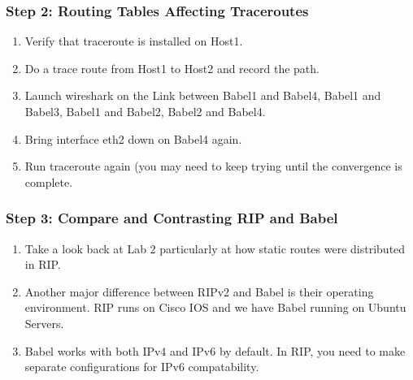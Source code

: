 \documentclass[main.tex]{subfiles}
\begin{document}
\begin{itemize}
\subsubsection{Step 2: Routing Tables Affecting Traceroutes}
\begin{enumerate}[noitemsep,label=$\bullet$,leftmargin=20mm,labelsep=0.5cm]
\item Verify that traceroute is installed on Host1.
\item  Do a trace route from Host1 to Host2 and record the path.
\item Launch wireshark on the Link between Babel1 and Babel4, Babel1 and Babel3, Babel1 and Babel2, Babel2 and Babel4.
\item Bring interface eth2 down on Babel4 again.
\item Run traceroute again (you may need to keep trying until the convergence is complete.
\end{enumerate}



\subsubsection{Step 3: Compare and Contrasting RIP and Babel}
\begin{enumerate}[noitemsep,label=$\bullet$,leftmargin=20mm,labelsep=0.5cm]
\item Take a look back at Lab 2 particularly at how static routes were distributed in RIP.


\item Another major difference between RIPv2 and Babel is their operating environment. RIP runs on Cisco IOS and we have Babel running on Ubuntu Servers.

\item Babel works with both IPv4 and IPv6 by default. In RIP, you need to make separate configurations for IPv6 compatability.


\end{enumerate}
\end{itemize}
\end{document}
